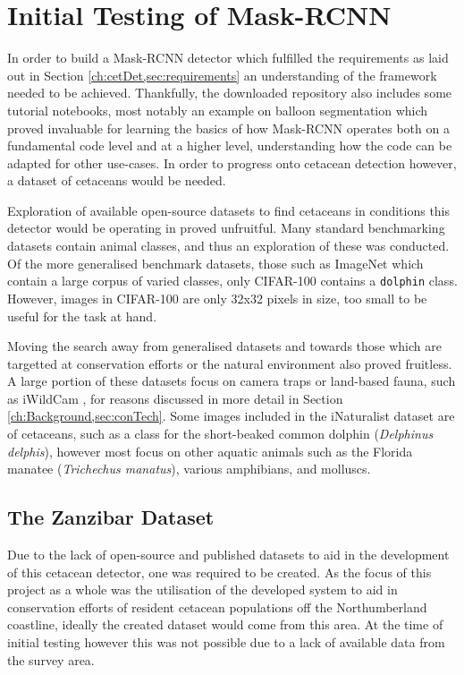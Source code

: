 \section{Initial Testing of Mask-RCNN}\label{ch:cetDet,sec:initialTesting}

In order to build a Mask-RCNN detector which fulfilled the requirements as laid out in Section \ref{ch:cetDet,sec:requirements} an understanding of the framework needed to be achieved. Thankfully, the downloaded repository also includes some tutorial notebooks, most notably an example on balloon segmentation which proved invaluable for learning the basics of how Mask-RCNN operates both on a fundamental code level and at a higher level, understanding how the code can be adapted for other use-cases. In order to progress onto cetacean detection however, a dataset of cetaceans would be needed. 

Exploration of available open-source datasets to find cetaceans in conditions this detector would be operating in proved unfruitful. Many standard benchmarking datasets contain animal classes, and thus an exploration of these was conducted. Of the more generalised benchmark datasets, those such as ImageNet \cite{deng_imagenet:_2009} which contain a large corpus of varied classes, only CIFAR-100 \cite{krizhevsky_learning_2009} contains a \texttt{dolphin} class. However, images in CIFAR-100 are only 32x32 pixels in size, too small to be useful for the task at hand. 

Moving the search away from generalised datasets and towards those which are targetted at conservation efforts or the natural environment also proved fruitless. A large portion of these datasets focus on camera traps or land-based fauna, such as iWildCam \cite{beery_iwildcam_2019}, for reasons discussed in more detail in Section \ref{ch:Background,sec:conTech}. Some images included in the iNaturalist dataset \cite{van_horn_inaturalist_2018} are of cetaceans, such as a class for the short-beaked common dolphin (\textit{Delphinus delphis}), however most focus on other aquatic animals such as the Florida manatee (\textit{Trichechus manatus}), various amphibians, and molluscs. 

\subsection{The Zanzibar Dataset}\label{ch:cetDet,sec:initialTesting,sub:zanzibar}

Due to the lack of open-source and published datasets to aid in the development of this cetacean detector, one was required to be created. As the focus of this project as a whole was the utilisation of the developed system to aid in conservation efforts of resident cetacean populations off the Northumberland coastline, ideally the created dataset would come from this area. At the time of initial testing however this was not possible due to a lack of available data from the survey area.


